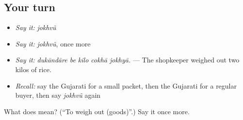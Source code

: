 \subsection*{Your turn}
\begin{itemize}
\raggedright
  \item \emph{Say it:} \emph{jokhvũ}
  \item \emph{Say it:} \emph{jokhvũ}, once more
  \item \emph{Say it:} \emph{dukāndāre be kilo cokhā jokhyā.} — The shopkeeper weighed out two kilos of rice.
  \item \emph{Recall:} say the Gujarati for a small packet, then the Gujarati for a regular buyer, then say \emph{jokhvũ} again
\end{itemize}

\begin{tcolorbox}[breakable,colback=teal!4,colframe=teal!35!black,title={Before you move on}]
What does  mean? (\textquotedblleft{}To weigh out (goods)\textquotedblright{}.) Say it once more.
\end{tcolorbox}
